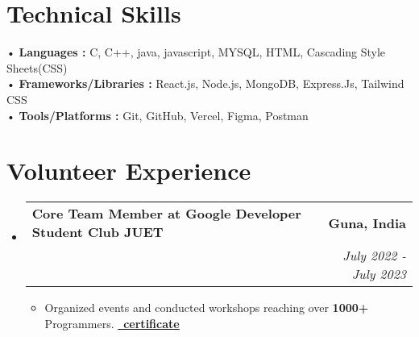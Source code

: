 \documentclass[letterpaper,11pt]{article}
\makeatletter
\newcommand{\resumeItem}[1]{
  \item\small{
	{#1 \vspace{-2pt}}
  }
}
\newcommand{\resumeSubheading}[4]{
  \vspace{-2pt}\item
	\begin{tabular*}{1.0\textwidth}[t]{l@{\extracolsep{\fill}}r}
  	\textbf{#1} & \textbf{\small #2} \\
  	\textit{\small#3} & \textit{\small #4} \\
	\end{tabular*}\vspace{-7pt}
}
\newcommand{\resumeSubHeadingListStart}{\begin{itemize}[leftmargin=0.0in, label={}]}
\newcommand{\resumeSubHeadingListEnd}{\end{itemize}}
\newcommand{\resumeItemListStart}{\begin{itemize}}
\newcommand{\resumeItemListEnd}{\end{itemize}\vspace{-5pt}}
\makeatother
\begin{document}
\section{Technical Skills }
 \begin{itemize}[leftmargin=0.12in, label={}]
	\small{\item{
 	\hspace{-5pt}• \textbf{Languages : }{ C, C++, java, javascript, MYSQL, HTML, Cascading Style Sheets(CSS) } \\  \vspace{4pt}
        \hspace{-5pt}• \textbf{Frameworks/Libraries :}  {React.js, Node.js, MongoDB, Express.Js, Tailwind CSS } \\  \vspace{4pt}
        \hspace{-5pt}• \textbf{Tools/Platforms :}  {Git, GitHub, Vercel, Figma, Postman} \\
	}}
 \end{itemize}
 \vspace{-11pt}

 
\section{Volunteer Experience}
\begin{itemize}[leftmargin=0.12in, label={}]
\vspace{-8pt}
  \resumeSubHeadingListStart
	\resumeSubheading 
  	{Core Team Member at Google Developer Student Club JUET}{Guna, India}
    {}{July 2022 - July 2023}
  	\resumeItemListStart
      \vspace{-9pt}
    	\resumeItem{Organized events and conducted workshops reaching over \textbf{1000+} Programmers. {\href{https://drive.google.com/file/d/16ciNXQLWNNuhST4ud0wVfPa3oEdIm71R/view?usp=sharing}{\small \raisebox{-0.2\height}\faCertificate\  \underline{\textbf{certificate}}} }} 
	\resumeItemListEnd
    
  \resumeSubHeadingListEnd
\end{itemize}
\vspace{-11pt}




 


 
\end{document}
